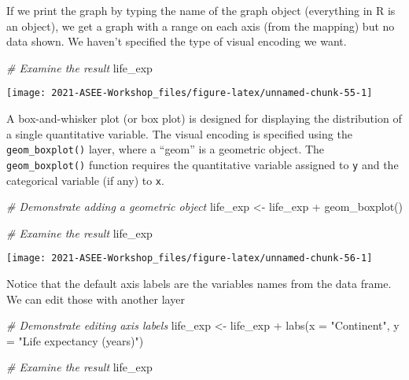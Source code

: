 \documentclass[
]{book}
\newenvironment{Shaded}{\begin{snugshade}}{\end{snugshade}}
\newcommand{\AttributeTok}[1]{\textcolor[rgb]{0.77,0.63,0.00}{#1}}
\newcommand{\CommentTok}[1]{\textcolor[rgb]{0.56,0.35,0.01}{\textit{#1}}}
\newcommand{\FunctionTok}[1]{\textcolor[rgb]{0.00,0.00,0.00}{#1}}
\newcommand{\NormalTok}[1]{#1}
\newcommand{\OtherTok}[1]{\textcolor[rgb]{0.56,0.35,0.01}{#1}}
\newcommand{\SpecialCharTok}[1]{\textcolor[rgb]{0.00,0.00,0.00}{#1}}
\newcommand{\StringTok}[1]{\textcolor[rgb]{0.31,0.60,0.02}{#1}}
\begin{document}
If we print the graph by typing the name of the graph object (everything in R is an object), we get a graph with a range on each axis (from the mapping) but no data shown. We haven't specified the type of visual encoding we want.

\begin{Shaded}
\begin{Highlighting}[]
\CommentTok{\# Examine the result}
\NormalTok{life\_exp}
\end{Highlighting}
\end{Shaded}

\texttt{[image: 2021-ASEE-Workshop\_files/figure-latex/unnamed-chunk-55-1]}

A box-and-whisker plot (or box plot) is designed for displaying the distribution of a single quantitative variable. The visual encoding is specified using the \texttt{geom\_boxplot()} layer, where a ``geom'' is a geometric object. The \texttt{geom\_boxplot()} function requires the quantitative variable assigned to \texttt{y} and the categorical variable (if any) to \texttt{x}.

\begin{Shaded}
\begin{Highlighting}[]
\CommentTok{\# Demonstrate adding a geometric object }
\NormalTok{life\_exp }\OtherTok{\textless{}{-}}\NormalTok{ life\_exp }\SpecialCharTok{+} 
  \FunctionTok{geom\_boxplot}\NormalTok{()}

\CommentTok{\# Examine the result}
\NormalTok{life\_exp}
\end{Highlighting}
\end{Shaded}

\texttt{[image: 2021-ASEE-Workshop\_files/figure-latex/unnamed-chunk-56-1]}

Notice that the default axis labels are the variables names from the data frame. We can edit those with another layer

\begin{Shaded}
\begin{Highlighting}[]
\CommentTok{\# Demonstrate editing axis labels}
\NormalTok{life\_exp }\OtherTok{\textless{}{-}}\NormalTok{ life\_exp }\SpecialCharTok{+} 
  \FunctionTok{labs}\NormalTok{(}\AttributeTok{x =} \StringTok{"Continent"}\NormalTok{, }\AttributeTok{y =} \StringTok{"Life expectancy (years)"}\NormalTok{)}

\CommentTok{\# Examine the result}
\NormalTok{life\_exp}
\end{Highlighting}
\end{Shaded}
\end{document}
